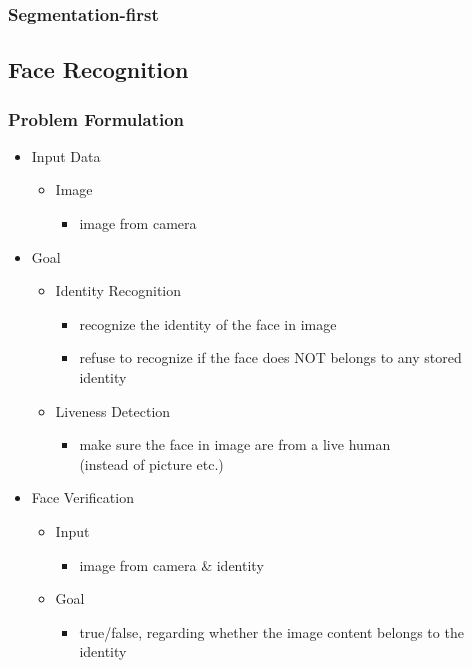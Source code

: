 \subsubsection{Segmentation-first}

\subsection{Face Recognition}
\subsubsection{Problem Formulation}
\begin{itemize}
\item Input Data
	\begin{itemize}
	\item Image 
		\begin{itemize}
		\item image from camera
		\end{itemize}
	\end{itemize}
\item Goal
	\begin{itemize}
	\item Identity Recognition
		\begin{itemize}
		\item recognize the identity of the face in image
		\item refuse to recognize if the face does NOT belongs to any stored identity
		\end{itemize}
	\item Liveness Detection
		\begin{itemize}
		\item make sure the face in image are from a live human \\
		(instead of picture etc.)
		\end{itemize}
	\end{itemize}
\item Face Verification
	\begin{itemize}
	\item Input
		\begin{itemize}
		\item image from camera \& identity
		\end{itemize}
	\item Goal
		\begin{itemize}
		\item true/false, regarding whether the image content belongs to the identity
		\end{itemize}
	\end{itemize}
	

\end{itemize}
